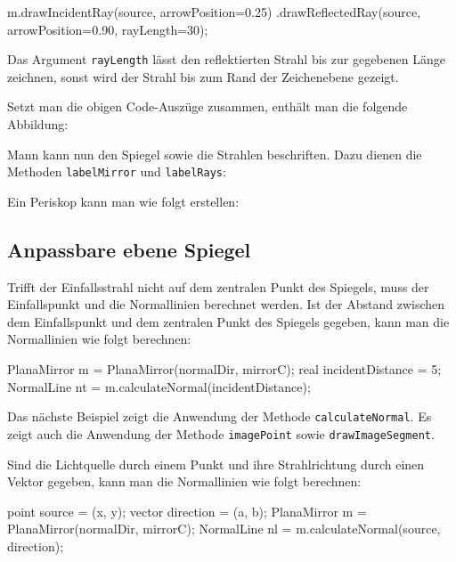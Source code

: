 \begin{asycode}
m.drawIncidentRay(source, arrowPosition=0.25)
 .drawReflectedRay(source, arrowPosition=0.90, rayLength=30); 
\end{asycode}

Das Argument \texttt{rayLength} lässt den reflektierten Strahl bis zur gegebenen Länge zeichnen, 
sonst wird der Strahl bis zum Rand der Zeichenebene gezeigt.

Setzt man die obigen Code-Auszüge zusammen, enthält man die folgende Abbildung:


Mann kann nun den Spiegel sowie die Strahlen beschriften.
Dazu dienen die Methoden \texttt{labelMirror} und \texttt{labelRays}:


Ein Periskop kann man wie folgt erstellen:


\subsection{Anpassbare ebene Spiegel}


Trifft der Einfallsstrahl nicht auf dem zentralen Punkt des Spiegels, muss der Einfallspunkt und die Normallinien berechnet werden.
Ist der Abstand zwischen dem Einfallspunkt und dem zentralen Punkt des Spiegels gegeben, kann man die Normallinien wie folgt berechnen:

\begin{asycode}
PlanaMirror m = PlanaMirror(normalDir, mirrorC);
real incidentDistance = 5;
NormalLine nt = m.calculateNormal(incidentDistance);
\end{asycode}


Das nächste Beispiel zeigt die Anwendung der Methode \texttt{calculateNormal}.
Es zeigt auch die Anwendung der Methode \texttt{imagePoint} sowie \texttt{drawImageSegment}.


Sind die Lichtquelle durch einem Punkt und ihre Strahlrichtung durch einen Vektor gegeben, kann man die Normallinien wie folgt berechnen:

\begin{asycode}
point source = (x, y);
vector direction = (a, b);
PlanaMirror m = PlanaMirror(normalDir, mirrorC);
NormalLine nl = m.calculateNormal(source, direction);
\end{asycode}

